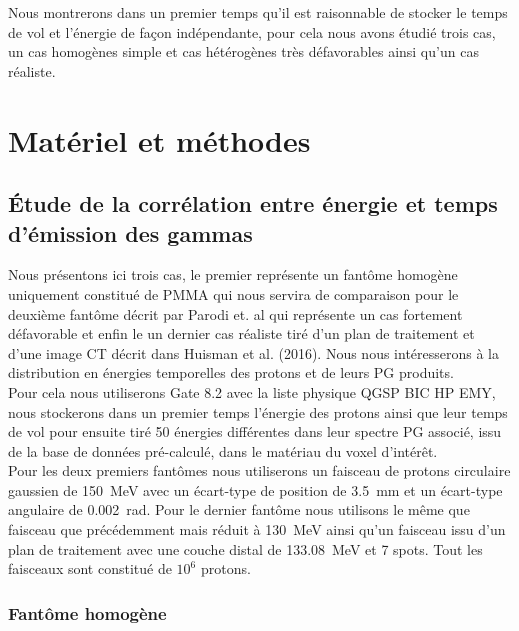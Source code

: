 \documentclass[11pt,a4paper,oldfontcommands]{memoir}
\begin{document}
 Nous montrerons dans un premier temps qu'il est raisonnable de stocker le temps de vol et l’énergie de façon indépendante, pour cela nous avons étudié trois cas, un cas homogènes simple et cas hétérogènes très défavorables ainsi qu'un cas réaliste. 

\section{Matériel et méthodes}

\subsection{\'Etude de la corrélation entre énergie et temps d'émission des gammas}

Nous présentons ici trois cas, le premier représente un fantôme homogène uniquement constitué de PMMA qui nous servira de comparaison pour le deuxième fantôme décrit par Parodi et. al \cite{1487723} qui représente un cas fortement défavorable et enfin le un dernier cas réaliste tiré d'un plan de traitement et d'une image CT décrit dans Huisman et al. (2016). Nous nous intéresserons à la distribution en énergies temporelles des protons et de leurs PG produits.\\ Pour cela nous utiliserons Gate 8.2 avec la liste physique QGSP BIC HP EMY, nous stockerons dans un premier temps l'énergie des protons ainsi que leur temps de vol pour ensuite tiré 50 énergies différentes dans leur spectre PG associé, issu de la base de données pré-calculé, dans le matériau du voxel d'intérêt.\\
Pour les deux premiers fantômes nous utiliserons un faisceau de protons circulaire gaussien de 150~MeV avec un écart-type de position de 3.5~mm et un écart-type angulaire de 0.002~rad. Pour le dernier fantôme nous utilisons le même que faisceau que précédemment mais réduit à 130~MeV ainsi qu'un faisceau issu d'un plan de traitement avec une couche distal de 133.08~MeV et 7 spots. Tout les faisceaux sont constitué de $10^6$ protons. 

\subsubsection{Fantôme homogène}
\end{document}
